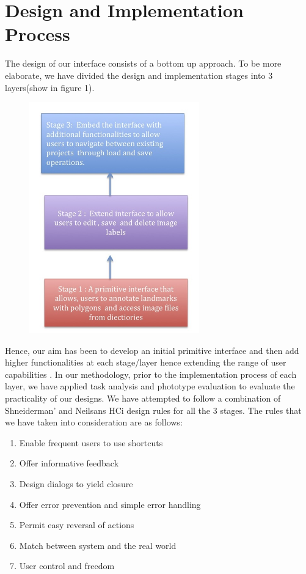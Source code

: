 \documentclass[11pt]{amsart}
\begin{document}
\section {Design  and  Implementation Process}

The design of our interface consists of a bottom up approach. To be more elaborate, we have divided the design and implementation stages into 3 layers(show in figure 1). 
\begin{figure}
\centerline{\includegraphics[height=100mm]{layers.jpg}}
\caption{}
\label{DM}
\end{figure}


Hence,  our aim  has been to develop an  initial primitive interface and then  add higher functionalities at each stage/layer hence extending the range of user capabilities . In our methodology, prior to the implementation process of each layer, we have applied  task analysis and phototype evaluation to evaluate the practicality of our designs.
We have attempted to follow  a combination of Shneiderman' and Neilsans HCi design rules for all the 3 stages. The rules that we have taken into consideration are as follows:
\begin{enumerate}
\item  Enable frequent users to use shortcuts
\item  Offer informative feedback
\item Design dialogs to yield closure
\item  Offer error prevention and simple error handling
\item  Permit easy reversal of actions
\item Match between system and the real world
\item User control and freedom
\end{enumerate}



 
\end{document}
